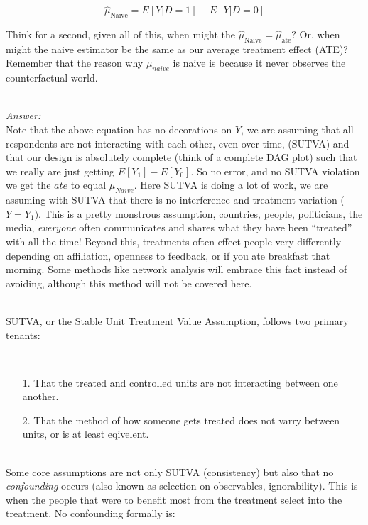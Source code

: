 \documentclass[12pt]{article}\usepackage[]{graphicx}\usepackage[]{color}
\begin{document}
\begin{flushleft}
\begin{equation}
\hat{\mu}_\text{Naive} = E[Y|D=1] - E[Y|D=0]
\end{equation}


Think for a second, given all of this, when might the $\hat{\mu}_\text{Naive} = \hat{\mu}_\text{ate}$? Or, when might the naive estimator be the same as our average treatment effect (ATE)? Remember that the reason why $\mu_{naive}$ is naive is because it never observes the counterfactual world.

\hfill \\

\noindent \textit{Answer:}\\

Note that the above equation has no decorations on $Y$, we are assuming that all respondents are not interacting with each other, even over time, (SUTVA) and that our design is absolutely complete (think of a complete DAG plot) such that we really are just getting $ E[Y_1] - E[Y_0]$. So no error, and no SUTVA violation we get the $ate$ to equal $\mu_{Naive}$.  Here SUTVA is doing a lot of work, we are assuming with SUTVA that there is no interference and treatment variation ($ Y = Y_1)$. This is a pretty monstrous assumption, countries, people, politicians, the media, \textit{everyone} often communicates and shares what they have been ``treated'' with all the time! Beyond this, treatments often effect people very differently depending on affiliation, openness to feedback, or if you ate breakfast that morning. Some methods like network analysis will embrace this fact instead of avoiding, although this method will not be covered here.

\hfill \\

\noindent SUTVA, or the Stable Unit Treatment Value Assumption, follows two primary tenants:

\hfill \\

\begin{itemize}
\item[1.] That the treated and controlled units are not interacting between one another.
\item[2.] That the method of how someone gets treated does not varry between units, or is at least eqivelent.
\end{itemize}

\hfill \\

\noindent Some core assumptions are not only SUTVA (consistency) but also that no \textit{confounding} occurs (also known as selection on observables, ignorability). This is when the people that were to benefit most from the treatment select into the treatment. No confounding formally is:   


\end{flushleft}
\end{document}
